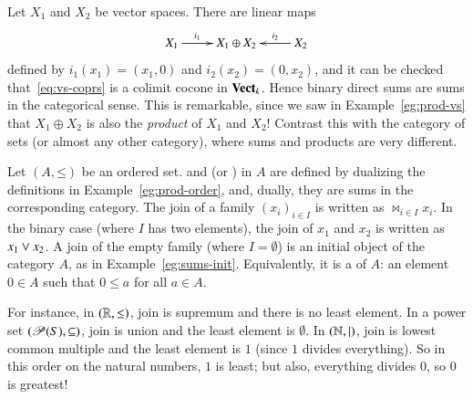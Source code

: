 \begin{example}
Let $X_1$ and $X_2$ be vector%
%
%
spaces.  There are linear maps
%
\begin{equation}
\label{eq:vs-coprs}
\begin{array}{c}
\xymatrix{
X_1 \ar[r]^-{i_1} &X_1 \oplus X_2        &X_2 \ar[l]_-{i_2}
}
\end{array}
\end{equation}
%
defined by $i_1(x_1) = (x_1, 0)$ and $i_2(x_2) = (0, x_2)$, and it can be
checked that~\eqref{eq:vs-coprs} is a colimit cocone in $\mathbf{Vect}_k$.  Hence
binary direct%
%
%
sums are sums in the categorical sense.  This is remarkable,
since we saw in Example~\ref{eg:prod-vs} that $X_1 \oplus X_2$ is also the
\emph{product} of $X_1$ and $X_2$!  Contrast this with the category of sets
(or almost any other category), where sums and products are very different.
\end{example}

\begin{example}
Let $(A, \mathord{\leq})$ be an ordered set.%
%
%
 and  (or )%
%
%
in $A$ are defined by dualizing the definitions in
Example~\ref{eg:prod-order}, and, dually, they are sums in the corresponding
category.  The join of a family $(x_i)_{i \in I}$ is written as $\Join_{\! i
\in I} x_i$.%
%
%
In the binary case (where $I$ has two elements), the join of $x_1$ and
$x_2$ is written as $x_1 \vee x_2$.%
%
%
A join of the empty family (where $I = \emptyset$) is an initial
object of the category $A$, as in Example~\ref{eg:sums-init}.
Equivalently, it is a  of $A$: an element $0 \in A$ such that $0 \leq a$ for all $a \in
A$.

For instance, in $(\mathbb{R}, \mathord{\leq})$, join is supremum%
%
%
and there is no least element.  In a power%
%
%
set $(\operatorname{\mathscr{P}}(S), \subseteq)$, join is union%
%
%
and the least element is $\emptyset$.  In $(\mathbb{N}, \mathbin{\mid})$, join is
lowest%
%
%
common multiple and the least element is $1$ (since $1$ divides
everything).  So in this order on the natural numbers, $1$ is least; but
also, everything divides $0$, so $0$ is greatest!
\end{example}


